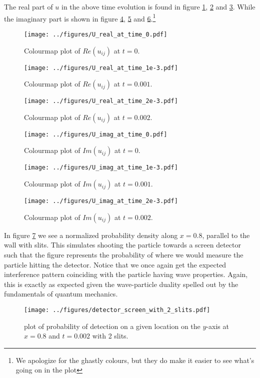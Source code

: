 \documentclass[english,notitlepage,reprint,nofootinbib]{revtex4-1}  %
\begin{document}
	The real part of $u$ in the above time evolution is found in figure \ref{fig:Re_t_0}, \ref{fig:Re_t_1} and \ref{fig:Re_t_2}. While the imaginary part is shown in figure \ref{fig:Im_t_0}, \ref{fig:Im_t_1} and \ref{fig:Im_t_2}.\footnote{We apologize for the ghastly colours, but they do make it easier to see what's going on in the plot}
	\begin{figure}[H]
		\centering
		\texttt{[image: ../figures/U\_real\_at\_time\_0.pdf]} %
		\caption{Colourmap plot of $Re(u_{ij})$ at $t=0$.}
		\label{fig:Re_t_0}
	\end{figure}
	
	\begin{figure}[H]
		\centering
		\texttt{[image: ../figures/U\_real\_at\_time\_1e-3.pdf]} %
		\caption{Colourmap plot of $Re(u_{ij})$ at $t=0.001$.}
		\label{fig:Re_t_1}
	\end{figure}
	
	\begin{figure}[H]
		\centering
		\texttt{[image: ../figures/U\_real\_at\_time\_2e-3.pdf]} %
		\caption{Colourmap plot of $Re(u_{ij})$ at $t=0.002$.}
		\label{fig:Re_t_2}
	\end{figure}
	
	\begin{figure}[H]
		\centering
		\texttt{[image: ../figures/U\_imag\_at\_time\_0.pdf]} %
		\caption{Colourmap plot of $Im(u_{ij})$ at $t=0$.}
		\label{fig:Im_t_0}
	\end{figure}
	
	\begin{figure}[H]
		\centering
		\texttt{[image: ../figures/U\_imag\_at\_time\_1e-3.pdf]} %
		\caption{Colourmap plot of $Im(u_{ij})$ at $t=0.001$.}
		\label{fig:Im_t_1}
	\end{figure}
	
	\begin{figure}[H]
		\centering
		\texttt{[image: ../figures/U\_imag\_at\_time\_2e-3.pdf]} %
		\caption{Colourmap plot of $Im(u_{ij})$ at $t=0.002$.}
		\label{fig:Im_t_2}
	\end{figure}
	
	In figure \ref{fig:prob_2_slits} we see a normalized probability density along $x=0.8$, parallel to the wall with slits. This simulates shooting the particle towards a screen detector such that the figure represents the probability of where we would measure the particle hitting the detector. Notice that we once again get the expected interference pattern coinciding with the particle having wave properties. Again, this is exactly as expected given the wave-particle duality spelled out by the fundamentals of quantum mechanics. 
	\begin{figure}[H]
		\centering
		\texttt{[image: ../figures/detector\_screen\_with\_2\_slits.pdf]} %
		\caption{plot of probability of detection on a given location on the $y$-axis at $x=0.8$ and $t=0.002$ with 2 slits.}
		\label{fig:prob_2_slits}
	\end{figure}
	
\end{document}
